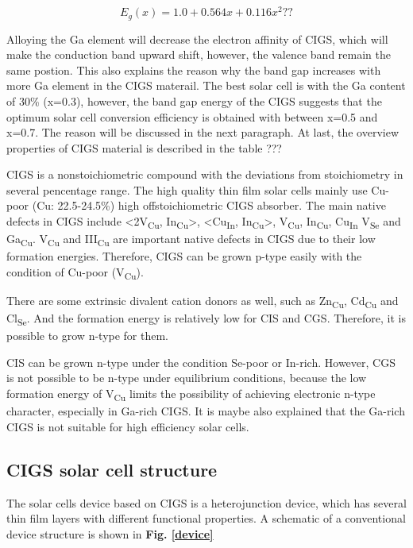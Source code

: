 \documentclass[a4paper, 12pt, titlepage,oneside,drop]{kthesis}
\begin{document}
\begin{equation}
E_g(x) = 1.0 + 0.564x+0.116x^2 ??
\end{equation}

Alloying the Ga element will decrease the electron affinity of CIGS, which will make the conduction band upward shift, however, the valence band remain the same postion. This also explains the reason why the band gap increases with 
more Ga element in the CIGS materail. The best solar cell is with the Ga content of 30\% (x=0.3), however, the band gap energy of the CIGS suggests that the optimum solar cell conversion efficiency is obtained with between x=0.5 
and x=0.7. The reason will be discussed in the next paragraph. At last, the overview properties of CIGS material is described in the table ???


CIGS is a nonstoichiometric compound with the deviations from stoichiometry in several pencentage range. The high quality thin film solar cells mainly use Cu-poor (Cu: 22.5-24.5\%) high offstoichiometric CIGS absorber.
The main native defects in CIGS include <2V\textsubscript{Cu}, In\textsubscript{Cu}>, <Cu\textsubscript{In}, In\textsubscript{Cu}>, V\textsubscript{Cu}, In\textsubscript{Cu}, Cu\textsubscript{In} V\textsubscript{Se}
and Ga\textsubscript{Cu}. V\textsubscript{Cu} and III\textsubscript{Cu} are important native defects in CIGS due to
their low formation energies. Therefore, CIGS can be grown p-type easily with the condition of Cu-poor (V\textsubscript{Cu}).

There are some extrinsic divalent cation donors as well, such as Zn\textsubscript{Cu}, Cd\textsubscript{Cu} and Cl\textsubscript{Se}. And the formation energy is relatively low for CIS and CGS. Therefore, it is possible to grow n-type for them.

CIS can be grown n-type under the condition Se-poor or In-rich. However, CGS is not possible to be n-type under equilibrium conditions, because the low formation energy of V\textsubscript{Cu} limits the possibility of achieving electronic n-type character, especially in Ga-rich CIGS.
It is maybe also explained that the Ga-rich CIGS is not suitable for high efficiency solar cells. 


\subsection{CIGS solar cell structure}

The solar cells device based on CIGS is a heterojunction device, which has several thin film layers with different functional properties. A schematic of a conventional device structure is shown in  \textbf{Fig. \ref{device}}
\end{document}
